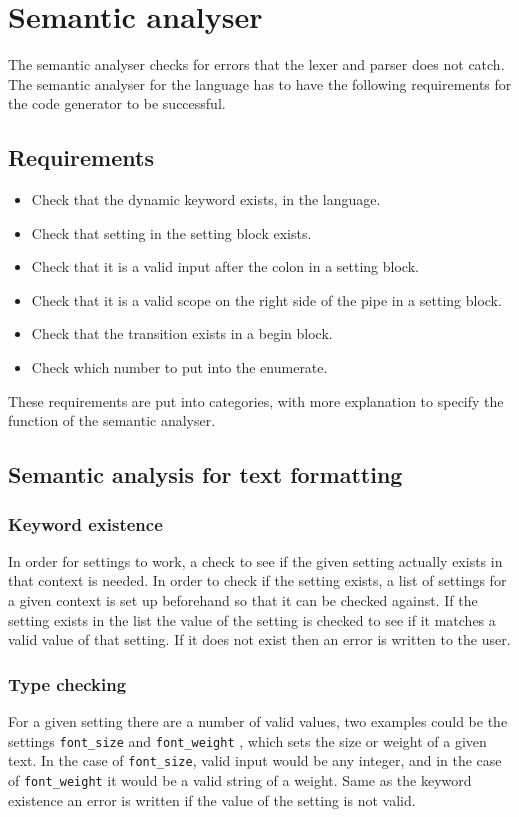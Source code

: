 \chapter{Semantic analyser}

The semantic analyser checks for errors that the lexer and parser does not catch. The semantic analyser for the language has to have the following requirements for the code generator to be successful.

\section{Requirements}
\begin{itemize}
	\item Check that the dynamic keyword exists, in the language.
	\item Check that setting in the setting block exists.
	\item Check that it is a valid input after the colon in a setting block.
	\item Check that it is a valid scope on the right side of the pipe in a setting block.
	\item Check that the transition exists in a begin block.
	\item Check which number to put into the enumerate.
\end{itemize}

These requirements are put into categories, with more explanation to specify the function of the semantic analyser.

\section{Semantic analysis for text formatting}

    \subsection{Keyword existence}
In order for settings to work, a check to see if the given setting actually exists in that context is needed. In order to check if the setting exists, a list of settings for a given context is set up beforehand so that it can be checked against. If the setting exists in the list the value of the setting is checked to see if it matches a valid value of that setting. If it does not exist then an error is written to the user.

    \subsection{Type checking}
For a given setting there are a number of valid values, two examples could be the settings \texttt{font\_size} and \texttt{font\_weight} , which sets the size or weight of a given text. In the case of \texttt{font\_size}, valid input would be any integer, and in the case of \texttt{font\_weight} it would be a valid string of a weight. Same as the keyword existence an error is written if the value of the setting is not valid.

